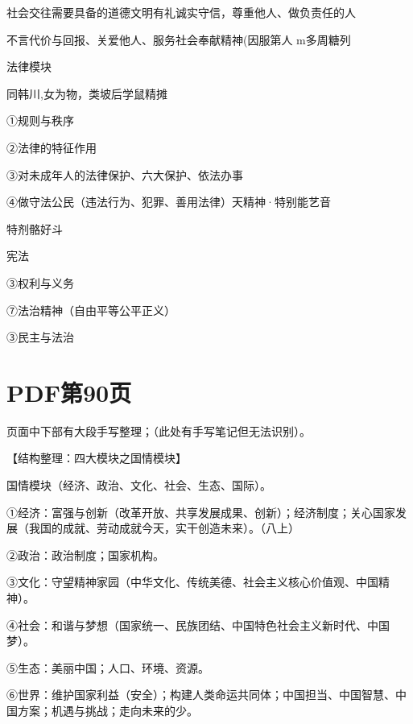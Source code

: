 \documentclass[lang=cn,11pt]{elegantbook}
\newcommand{\daofasym}[1]{{\daofasymbolfont #1}}
\newcommand{\daofasym}[1]{#1}
\begin{document}
社会交往需要具备的道德文明有礼诚实守信，尊重他人、做负责任的人\par

不言代价与回报、关爱他人、服务社会奉献精神(因服第人 m多周糖列\par

法律模块\par

同韩川,女为物，类坡后学鼠精摊\par

\daofasym{①}规则与秩序\par

\daofasym{②}法律的特征作用\par

\daofasym{③}对未成年人的法律保护、六大保护、依法办事\par

\daofasym{④}做守法公民（违法行为、犯罪、善用法律）天精神·特别能艺音\par

特剂骼好斗\par

宪法\par

\daofasym{③}权利与义务\par

\daofasym{⑦}法治精神（自由平等公平正义）\par

\daofasym{③}民主与法治\par


\section*{PDF第90页}

\begin{note}[手写批注]
页面中下部有大段手写整理；（此处有手写笔记但无法识别）。\par
\end{note}

【结构整理：四大模块之国情模块】\par

国情模块（经济、政治、文化、社会、生态、国际）。\par

\daofasym{①}经济：富强与创新（改革开放、共享发展成果、创新）；经济制度；关心国家发展（我国的成就、劳动成就今天，实干创造未来）。（八上）\par

\daofasym{②}政治：政治制度；国家机构。\par

\daofasym{③}文化：守望精神家园（中华文化、传统美德、社会主义核心价值观、中国精神）。\par

\daofasym{④}社会：和谐与梦想（国家统一、民族团结、中国特色社会主义新时代、中国梦）。\par

\daofasym{⑤}生态：美丽中国；人口、环境、资源。\par

\daofasym{⑥}世界：维护国家利益（安全）；构建人类命运共同体；中国担当、中国智慧、中国方案；机遇与挑战；走向未来的少。\par
\end{document}
